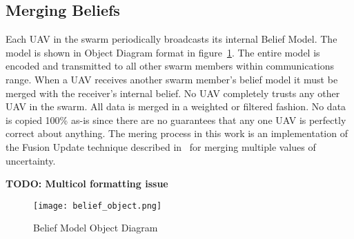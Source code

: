 \begin{multicols*}{2}
\subsection{Merging Beliefs}
Each UAV in the swarm periodically broadcasts its internal Belief Model.  The model is shown in Object Diagram format in figure~\ref{fig:belief_object}.  The entire model is encoded and transmitted to all other swarm members within communications range.   When a UAV receives another swarm member's belief model it must be merged with the receiver's internal belief.  No UAV completely trusts any other UAV in the swarm.  All data is merged in a weighted or filtered fashion.  No data is copied 100\% as-is since there are no guarantees that any one UAV is perfectly correct about anything.  The mering process in this work is an implementation of the Fusion Update technique described in~\cite{shem} for merging multiple values of uncertainty.

\textbf{TODO: Multicol formatting issue}
\end{multicols*}
\begin{figure}[H]
	\centering
	\texttt{[image: belief\_object.png]}
	\caption{Belief Model Object Diagram}
	\label{fig:belief_object}
\end{figure}
